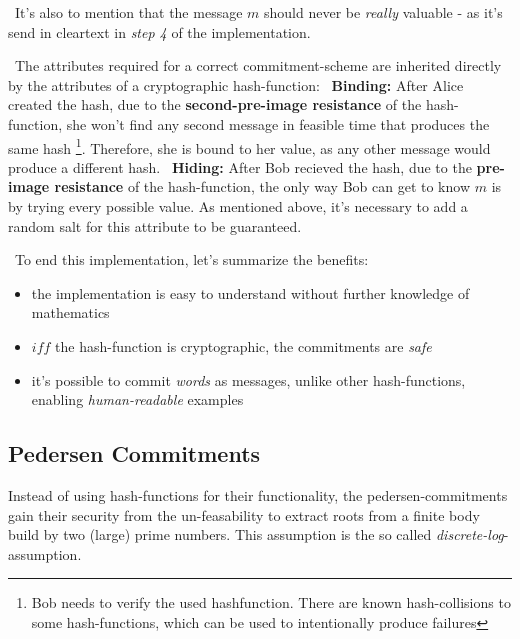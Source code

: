 ~\newline It's also to mention that the message $m$ should never be \textit{really} valuable - as it's send in cleartext in \textit{step 4} of the implementation.  

~\newline The attributes required for a correct commitment-scheme are inherited directly by the attributes of a cryptographic hash-function: 
~\newline \textbf{Binding:} After Alice created the hash, due to the \textbf{second-pre-image resistance} of the hash-function, she won't find any second message in feasible time that produces the same hash \footnote{Bob needs to verify the used hashfunction. There are known hash-collisions to some hash-functions, which can be used to intentionally produce failures}. Therefore, she is bound to her value, as any other message would produce a different hash.  
~\newline \textbf{Hiding:} After Bob recieved the hash, due to the \textbf{pre-image resistance} of the hash-function, the only way Bob can get to know $m$ is by trying every possible value. As mentioned above, it's necessary to add a random salt for this attribute to be guaranteed.

~\newline To end this implementation, let's summarize the benefits: 
\begin{itemize}
	\item the implementation is easy to understand without further knowledge of mathematics
	\item $iff$ the hash-function is cryptographic, the commitments are \textit{safe}
	\item it's possible to commit \textit{words} as messages, unlike other hash-functions, enabling \textit{human-readable} examples  
\end{itemize} 

\subsection{Pedersen Commitments}
Instead of using hash-functions for their functionality, the pedersen-commitments gain their security from the un-feasability to extract roots from a finite body build by two (large) prime numbers. This assumption is the so called \textit{discrete-log}-assumption. 

